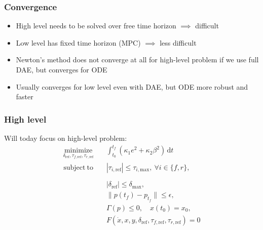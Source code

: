 \documentclass[]{beamer}
\begin{document}
\begin{frame}
\frametitle{Convergence}
\begin{itemize}
\item
High level needs to be solved over free time horizon $\implies$ difficult
\item
Low level has fixed time horizon (MPC) $\implies$ less difficult
\item
Newton's method does not converge at all for high-level problem if we use full DAE, but converges for ODE
\item
Usually converges for low level even with DAE, but ODE more robust and faster
\end{itemize}
\end{frame}

\begin{frame}
\frametitle{High level}
Will today focus on high-level problem:
\begin{equation}
\begin{aligned}
	\underset{\delta_\mathrm{ref},\tau_{f,\mathrm{ref}},\tau_{r,\mathrm{ref}}}{\mathrm{minimize}} & \quad \int_{t_0}^{t_f}\!(\kappa_1 e^2 + \kappa_2\beta^2) \,\mathrm{d}t  \\
	\underset{\phantom{\delta_\mathrm{ref},\tau_{f,\mathrm{ref}},\tau_{r,\mathrm{ref}}}}{\mathrm{subject \ to}} & \quad    |\tau_{i,\mathrm{ref}}|
     \leq \tau_{i,\mathrm{max}}, \ \forall i \in \{f,r\}, \\[-10pt]
& \quad |\delta_\mathrm{ref}| \leq \delta_{\mathrm{max}},  \\
& \quad \lVert p(t_f)-p_{t_f}\rVert\leq \epsilon,\\
&           \quad \Gamma(p) \leq 0, \quad x(t_0) = x_0, \\
	& \quad F(\dot x,x,y,\delta_\mathrm{ref},\tau_{f,\mathrm{ref}},\tau_{r,\mathrm{ref}}) = 0
\end{aligned}
\end{equation}
\end{frame}
\end{document}
